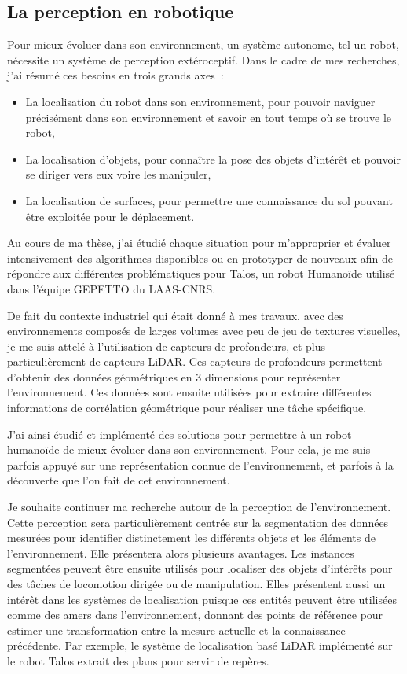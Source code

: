 \subsection{La perception en robotique}

Pour mieux évoluer dans son environnement, un système autonome, tel un robot, nécessite un système de perception extéroceptif. Dans le cadre de mes recherches, j'ai résumé ces besoins en trois grands axes~:
\begin{itemize}
  \item La localisation du robot dans son environnement, pour pouvoir naviguer précisément dans son environnement et savoir en tout temps où se trouve le robot,
  \item La localisation d'objets, pour connaître la pose des objets d'intérêt et pouvoir se diriger vers eux voire les manipuler,
  \item La localisation de surfaces, pour permettre une connaissance du sol pouvant être exploitée pour le déplacement.
\end{itemize}

Au cours de ma thèse, j'ai étudié chaque situation pour m'approprier et évaluer intensivement des algorithmes disponibles ou en prototyper de nouveaux afin de répondre aux différentes problématiques pour Talos, un robot Humanoïde utilisé dans l'équipe GEPETTO du LAAS-CNRS.

De fait du contexte industriel qui était donné à mes travaux, avec des environnements composés de larges volumes avec peu de jeu de textures visuelles, je me suis attelé à l'utilisation de capteurs de profondeurs, et plus particulièrement de capteurs LiDAR. Ces capteurs de profondeurs permettent d'obtenir des données géométriques en 3 dimensions pour représenter l'environnement. Ces données sont ensuite utilisées pour extraire différentes informations de corrélation géométrique pour réaliser une tâche spécifique.

J'ai ainsi étudié et implémenté des solutions pour permettre à un robot humanoïde de mieux évoluer dans son environnement. Pour cela, je me suis parfois appuyé sur une représentation connue de l'environnement, et parfois à la découverte que l'on fait de cet environnement.

Je souhaite continuer ma recherche autour de la perception de l'environnement. Cette perception sera particulièrement centrée sur la segmentation des données mesurées pour identifier distinctement les différents objets et les éléments de l'environnement. Elle présentera alors plusieurs avantages. Les instances segmentées peuvent être ensuite utilisés pour localiser des objets d'intérêts pour des tâches de locomotion dirigée ou de manipulation. Elles présentent aussi un intérêt dans les systèmes de localisation puisque ces entités peuvent être utilisées comme des amers dans l'environnement, donnant des points de référence pour estimer une transformation entre la mesure actuelle et la connaissance précédente. Par exemple, le système de localisation basé LiDAR implémenté sur le robot Talos extrait des plans pour servir de repères.

